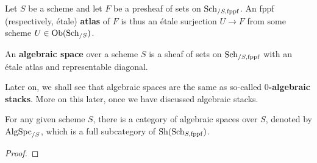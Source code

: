             \begin{definition}[Atlases] \label{def: atlases}
                Let $S$ be a scheme and let $F$ be a presheaf of sets on $\mathrm{Sch}_{/S, \mathrm{fppf}}$. An fppf (respectively, \'etale) \textbf{atlas} of $F$ is thus an \'etale surjection $U \to F$ from some scheme $U \in \mathrm{Ob}(\mathrm{Sch}_{/S})$.
            \end{definition}
            \begin{definition} \label{def: algebraic_spaces}
                An \textbf{algebraic space} over a scheme $S$ is a sheaf of sets on $\mathrm{Sch}_{/S, \mathrm{fppf}}$ with an \'etale atlas and representable diagonal.
            \end{definition}
            \begin{remark}
                Later on, we shall see that algebraic spaces are the same as so-called \textbf{$0$-algebraic stacks}. More on this later, once we have discussed algebraic stacks.
            \end{remark}
            \begin{proposition} \label{prop: the_category_of_algebraic_spaces}
                For any given scheme $S$, there is a category of algebraic spaces over $S$, denoted by $\mathrm{Alg}\mathrm{Spc}_{/S}$, which is a full subcategory of $\mathrm{Sh}(\mathrm{Sch}_{S, \mathrm{fppf}})$. 
            \end{proposition}
                \begin{proof}
                    
                \end{proof}
                
